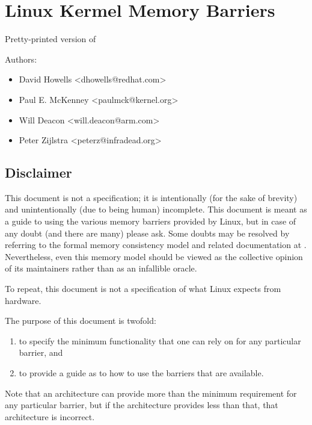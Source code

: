 \chapter{Linux Kermel Memory Barriers}

\begin{Note}
Pretty-printed version of 
\end{Note}

\begin{Note}
Authors:

\begin{itemize}[nosep]
  \item David Howells <dhowells@redhat.com>
  \item Paul E. McKenney <paulmck@kernel.org>
  \item Will Deacon <will.deacon@arm.com>
  \item Peter Zijlstra <peterz@infradead.org>
\end{itemize}
\end{Note}

\section{Disclaimer}

This document is not a specification; it is intentionally (for the sake of
brevity) and unintentionally (due to being human) incomplete.
This document is meant as a guide to using the various memory barriers
provided by Linux, but in case of any doubt (and there are many) please ask.
Some doubts may be resolved by referring to the formal memory consistency
model and related documentation at .
Nevertheless, even this memory model should be viewed as the collective
opinion of its maintainers rather than as an infallible oracle.

To repeat, this document is not a specification of what Linux expects from
hardware.

The purpose of this document is twofold:

\begin{enumerate}
  \item to specify the minimum functionality that one can rely on for any
        particular barrier, and
  \item to provide a guide as to how to use the barriers that are available.
\end{enumerate}

Note that an architecture can provide more than the minimum requirement
for any particular barrier, but if the architecture provides less than
that, that architecture is incorrect.

